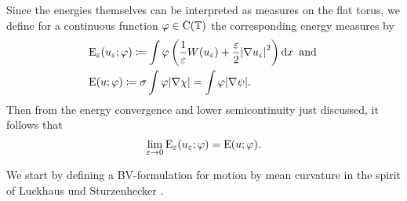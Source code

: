 Since the energies themselves can be interpreted as measures on the flat torus, 
we define for a continuous function $ \varphi \in \operatorname{C} ( \operatorname{\mathbb{T}} ) $ the 
corresponding energy measures by
\begin{align*}
	& \operatorname{E}_{ \varepsilon } ( u_{ \varepsilon} ; \varphi )
	\coloneqq
	\int
	\varphi
	\left(
	\frac{ 1 }{ \varepsilon }
	W ( u_{ \varepsilon } )
	+
	\frac{ \varepsilon }{ 2 }
	\abs{ \nabla u_{ \varepsilon } }^{ 2 }
	\right)
	\dd{x } 
	\text{ and }
	\\
	& \operatorname{E} ( u ; \varphi )
	\coloneqq
	\sigma
	\int
	\varphi
	\abs{ \nabla \chi }
	=
	\int
		\varphi
	\abs{ \nabla \psi }.
\end{align*}
Then from the energy convergence and lower semicontinuity just discussed, it 
follows that 
\begin{equation}
	\label{convergence_of_energy_measures}
	\lim_{ \varepsilon \to 0 }
	\operatorname{E}_{ \varepsilon } ( u_{ \varepsilon } ; \varphi )
	=
	\operatorname{E} ( u ; \varphi ).
\end{equation}

We start by defining a BV-formulation for motion by mean curvature in the 
spirit of Luckhaus und Sturzenhecker 
\cite{luckhaus_sturzenhecker_implicit_time_discretization_for_mcf}.

